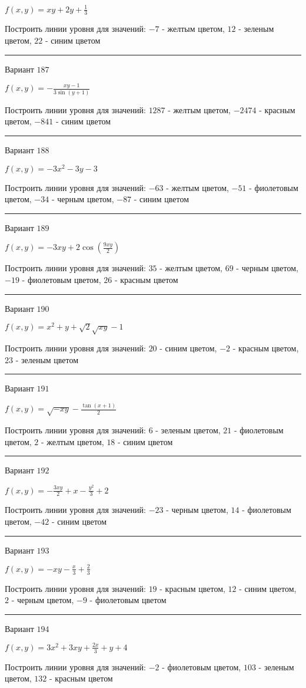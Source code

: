 \documentclass[11pt]{report}
\begin{document}
$f(x, y) = x y + 2 y + \frac{1}{3}$

Построить линии уровня для значений: $-7$ - желтым цветом, $12$ - зеленым цветом, $22$ - синим цветом
\begin{center}
\noindent\rule{8cm}{0.4pt}
\end{center}
Вариант $187$


$f(x, y) = - \frac{x y - 1}{3 \sin{\left(y + 1 \right)}}$

Построить линии уровня для значений: $1287$ - желтым цветом, $-2474$ - красным цветом, $-841$ - синим цветом
\begin{center}
\noindent\rule{8cm}{0.4pt}
\end{center}
Вариант $188$


$f(x, y) = - 3 x^{2} - 3 y - 3$

Построить линии уровня для значений: $-63$ - желтым цветом, $-51$ - фиолетовым цветом, $-34$ - черным цветом, $-87$ - синим цветом
\begin{center}
\noindent\rule{8cm}{0.4pt}
\end{center}
Вариант $189$


$f(x, y) = - 3 x y + 2 \cos{\left(\frac{9 x y}{2} \right)}$

Построить линии уровня для значений: $35$ - желтым цветом, $69$ - черным цветом, $-19$ - фиолетовым цветом, $26$ - красным цветом
\begin{center}
\noindent\rule{8cm}{0.4pt}
\end{center}
Вариант $190$


$f(x, y) = x^{2} + y + \sqrt{2} \sqrt{x y} - 1$

Построить линии уровня для значений: $20$ - синим цветом, $-2$ - красным цветом, $23$ - зеленым цветом
\begin{center}
\noindent\rule{8cm}{0.4pt}
\end{center}
Вариант $191$


$f(x, y) = \sqrt{- x y} - \frac{\tan{\left(x + 1 \right)}}{2}$

Построить линии уровня для значений: $6$ - зеленым цветом, $21$ - фиолетовым цветом, $2$ - желтым цветом, $18$ - синим цветом
\begin{center}
\noindent\rule{8cm}{0.4pt}
\end{center}
Вариант $192$


$f(x, y) = - \frac{3 x y}{2} + x - \frac{y^{2}}{3} + 2$

Построить линии уровня для значений: $-23$ - черным цветом, $14$ - фиолетовым цветом, $-42$ - синим цветом
\begin{center}
\noindent\rule{8cm}{0.4pt}
\end{center}
Вариант $193$


$f(x, y) = - x y - \frac{x}{3} + \frac{2}{3}$

Построить линии уровня для значений: $19$ - красным цветом, $12$ - синим цветом, $2$ - черным цветом, $-9$ - фиолетовым цветом
\begin{center}
\noindent\rule{8cm}{0.4pt}
\end{center}
Вариант $194$


$f(x, y) = 3 x^{2} + 3 x y + \frac{2 x}{3} + y + 4$

Построить линии уровня для значений: $-2$ - фиолетовым цветом, $103$ - зеленым цветом, $132$ - красным цветом
\end{document}

